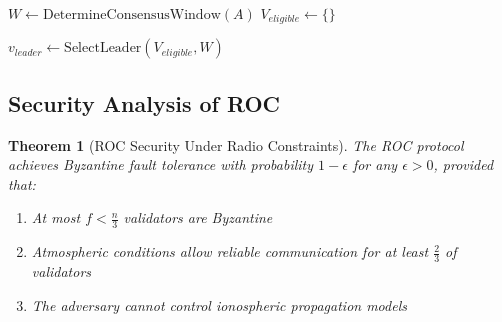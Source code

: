 \documentclass[11pt,a4paper]{article}
\newtheorem{theorem}{Theorem}[section]
\begin{document}
\begin{algorithm}[H]
\SetAlgoLined
{}
\caption{Radio-Optimized Consensus Protocol}

$W \leftarrow \text{DetermineConsensusWindow}(A)$\;
$V_{eligible} \leftarrow \{\}$\;


$v_{leader} \leftarrow \text{SelectLeader}(V_{eligible}, W)$\;

\Return{$\perp$}\;
\end{algorithm}

\subsection{Security Analysis of ROC}

\begin{theorem}[ROC Security Under Radio Constraints]
The ROC protocol achieves Byzantine fault tolerance with probability $1 - \epsilon$ for any $\epsilon > 0$, provided that:
\begin{enumerate}
\item At most $f < \frac{n}{3}$ validators are Byzantine
\item Atmospheric conditions allow reliable communication for at least $\frac{2}{3}$ of validators
\item The adversary cannot control ionospheric propagation models
\end{enumerate}
\end{theorem}
\end{document}
